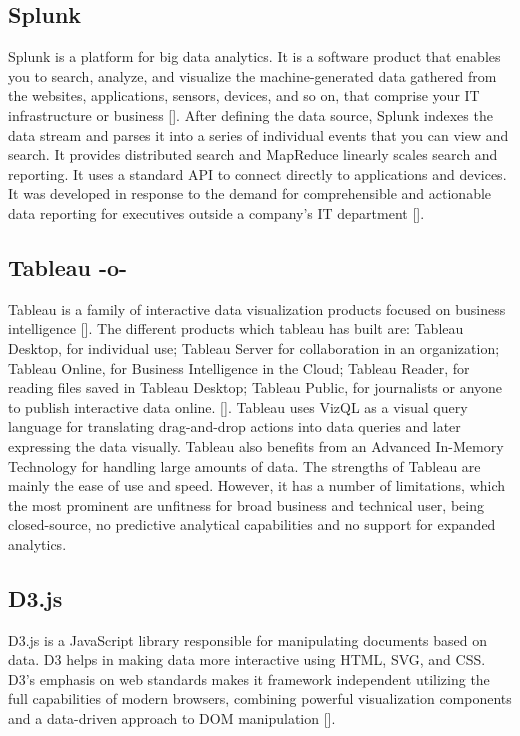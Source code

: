 \subsection{Splunk}

Splunk is a platform for big data analytics. It is a software product
that enables you to search, analyze, and visualize the
machine-generated data gathered from the websites, applications,
sensors, devices, and so on, that comprise your IT infrastructure or
business [\cite{www-splunk}]. After defining the data source, Splunk
indexes the data stream and parses it into a series of individual
events that you can view and search. It provides distributed search
and MapReduce linearly scales search and reporting. It uses a standard
API to connect directly to applications and devices. It was developed
in response to the demand for comprehensible and actionable data
reporting for executives outside a company's IT
department [\cite{www-splunk}].
    
\subsection{Tableau -o-}

Tableau is a family of interactive data visualization products focused
on business intelligence [\cite{www-tableau-tutorial}]. The different
products which tableau has built are: Tableau Desktop, for individual
use; Tableau Server for collaboration in an organization; Tableau
Online, for Business Intelligence in the Cloud; Tableau Reader, for
reading files saved in Tableau Desktop; Tableau Public, for
journalists or anyone to publish interactive data
online. [\cite{www-tableau-web}]. Tableau uses VizQL as a visual query
language for translating drag-and-drop actions into data queries and
later expressing the data visually. Tableau also benefits from an
Advanced In-Memory Technology for handling large amounts of data.  The
strengths of Tableau are mainly the ease of use and speed.  However,
it has a number of limitations, which the most prominent are unfitness
for broad business and technical user, being closed-source, no
predictive analytical capabilities and no support for expanded
analytics.



\subsection{D3.js}

D3.js is a JavaScript library responsible for manipulating documents
based on data. D3 helps in making data more interactive using HTML,
SVG, and CSS. D3's emphasis on web standards makes it framework
independent utilizing the full capabilities of modern browsers,
combining powerful visualization components and a data-driven approach
to DOM manipulation [\cite{www-d3}].

